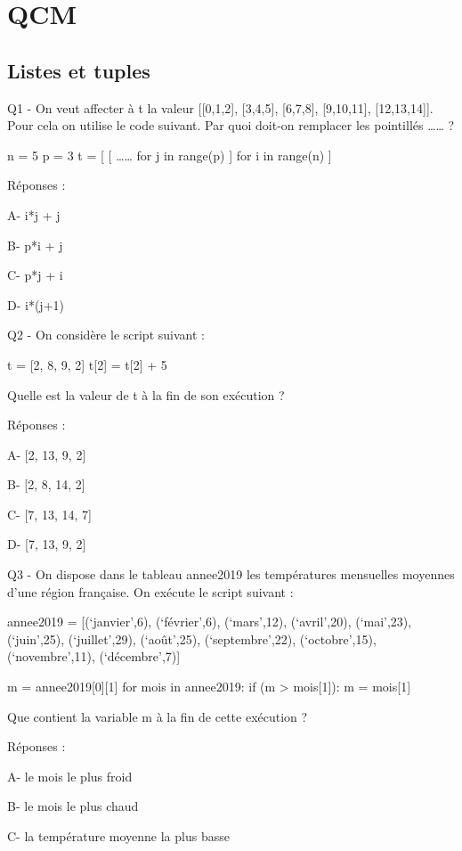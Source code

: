 \documentclass[
]{book}
\begin{document}
\hypertarget{qcm}{%
\chapter{QCM}\label{qcm}}

\hypertarget{listes-et-tuples-1}{%
\section{Listes et tuples}\label{listes-et-tuples-1}}

Q1 - On veut affecter à t la valeur {[}{[}0,1,2{]}, {[}3,4,5{]}, {[}6,7,8{]}, {[}9,10,11{]}, {[}12,13,14{]}{]}. Pour cela on utilise le code suivant. Par quoi doit-on remplacer les pointillés \ldots\ldots{} ?

n = 5
p = 3
t = {[} {[} \ldots\ldots{} for j in range(p) {]} for i in range(n) {]}

Réponses :

A- i*j + j

B- p*i + j

C- p*j + i

D- i*(j+1)

Q2 - On considère le script suivant :

t = {[}2, 8, 9, 2{]}
t{[}2{]} = t{[}2{]} + 5

Quelle est la valeur de t à la fin de son exécution ?

Réponses :

A- {[}2, 13, 9, 2{]}

B- {[}2, 8, 14, 2{]}

C- {[}7, 13, 14, 7{]}

D- {[}7, 13, 9, 2{]}

Q3 - On dispose dans le tableau annee2019 les températures mensuelles moyennes d'une région française. On exécute le script suivant :

annee2019 = {[}(`janvier',6), (`février',6), (`mars',12),
(`avril',20), (`mai',23), (`juin',25),
(`juillet',29), (`août',25), (`septembre',22),
(`octobre',15), (`novembre',11), (`décembre',7){]}

m = annee2019{[}0{]}{[}1{]}
for mois in annee2019:
if (m \textgreater{} mois{[}1{]}):
m = mois{[}1{]}

Que contient la variable m à la fin de cette exécution ?

Réponses :

A- le mois le plus froid

B- le mois le plus chaud

C- la température moyenne la plus basse
\end{document}
